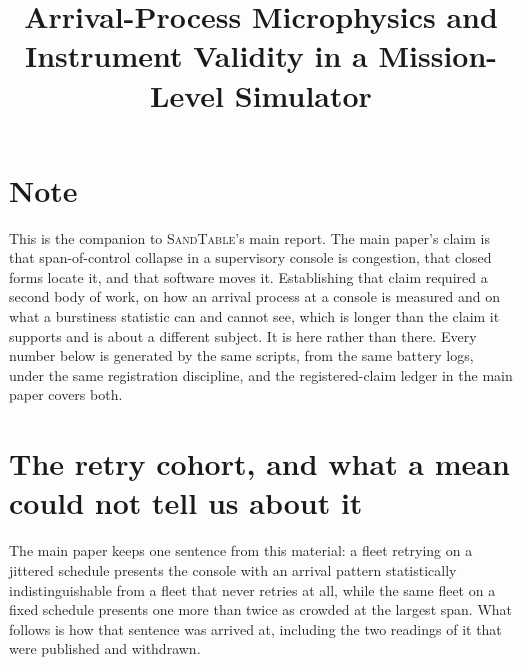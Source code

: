 \documentclass[11pt]{article}
\title{Arrival-Process Microphysics and Instrument Validity in a Mission-Level Simulator}
\author{}
\date{}
\newcommand{\sandtable}{\textsc{SandTable}}
\begin{document}
\maketitle

\section*{Note}

This is the companion to \sandtable{}'s main report. The main paper's claim is that span-of-control collapse in a supervisory console is congestion, that closed forms locate it, and that software moves it. Establishing that claim required a second body of work, on how an arrival process at a console is measured and on what a burstiness statistic can and cannot see, which is longer than the claim it supports and is about a different subject. It is here rather than there. Every number below is generated by the same scripts, from the same battery logs, under the same registration discipline, and the registered-claim ledger in the main paper covers both.

\section{The retry cohort, and what a mean could not tell us about it}

The main paper keeps one sentence from this material: a fleet retrying on a jittered schedule presents the console with an arrival pattern statistically indistinguishable from a fleet that never retries at all, while the same fleet on a fixed schedule presents one more than twice as crowded at the largest span. What follows is how that sentence was arrived at, including the two readings of it that were published and withdrawn.
\end{document}
